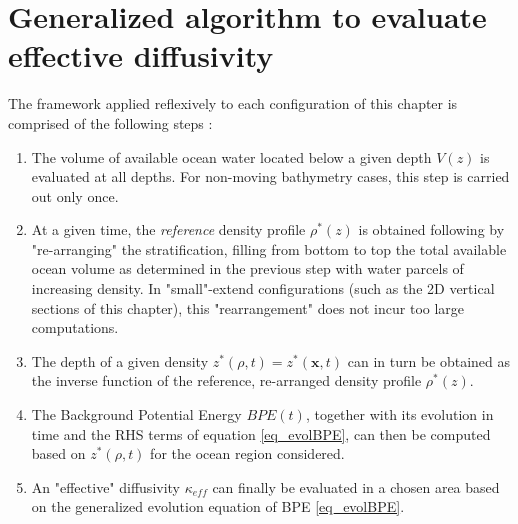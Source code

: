 \section{Generalized algorithm to evaluate effective diffusivity}
\label{BPE_algo}
The framework applied reflexively to each configuration of this chapter is comprised of the following steps : 
\begin{enumerate}
\setlength\itemsep{0pt}
\item The volume of available ocean water located below a given depth $V(z)$ is evaluated at all depths. For non-moving bathymetry cases, this step is carried out only once. 
\item At a given time, the \textit{reference} density profile $\rho^*(z)$ is obtained following \citet{winters_available_1995} by "re-arranging" the stratification, filling from bottom to top the total available ocean volume as determined in the previous step with water parcels of increasing density. In "small"-extend configurations (such as the 2D vertical sections of this chapter), this "rearrangement" does not incur too large computations.%
\item The depth of a given density $z^*(\rho,t)=z^*(\mathbf{x},t)$ can in turn be obtained as the inverse function of the reference, re-arranged density profile $\rho^*(z)$. 
\item The Background Potential Energy $BPE(t)$, together with its evolution in time and the RHS terms of equation \ref{eq_evolBPE}, can then be computed based on $z^*(\rho,t)$ for the ocean region considered.
\item An "effective" diffusivity $\kappa_{eff}$ can finally be evaluated in a chosen area based on the generalized evolution equation of BPE \ref{eq_evolBPE}.
\end{enumerate}


